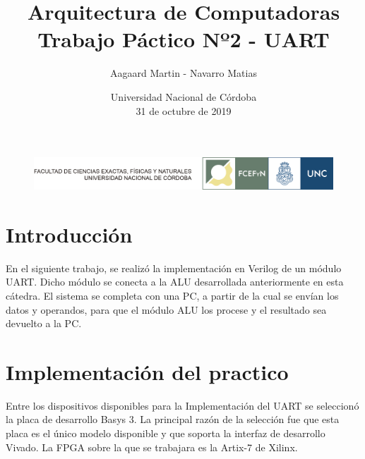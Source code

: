 \documentclass[12pt,A4paper,titlepage]{article}
\begin{document}
\renewcommand{\tablename}{Tabla}
\large

\title{Arquitectura de Computadoras \\
\large Trabajo Páctico Nº2 - UART}
\author{Aagaard Martin - Navarro Matias
\bigskip
\bigskip}

\date{Universidad Nacional de Córdoba \\ 31 de octubre de 2019}

\begin{titlepage}
\center


\begin{figure}[h]
    \centering
    \includegraphics[scale=0.8]{figure/logos-fcefyn-y-unc.png}
    \label{fig:unc-logo}
\end{figure}

{\let\newpage\relax\maketitle}
\center
\end{titlepage}

\maketitle %
\tableofcontents %
\newpage

\section{Introducción}
En el siguiente trabajo, se realizó la implementación en Verilog de un módulo UART. Dicho módulo se conecta a la ALU desarrollada anteriormente en esta cátedra. El sistema se completa con una PC, a partir de la cual se envían los datos y operandos, para que el módulo ALU los procese y el resultado sea devuelto a la PC.

\section{Implementación del practico}
Entre los dispositivos disponibles para la Implementación del UART se seleccionó la placa de desarrollo Basys 3. La principal razón de la selección fue que esta placa es el único modelo disponible y que soporta la interfaz de desarrollo Vivado. La FPGA sobre la que se trabajara es la Artix-7 de Xilinx.
\end{document}
